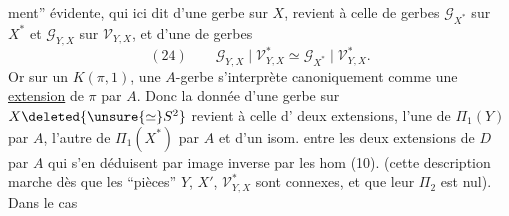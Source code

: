 ment'' évidente, qui ici dit 
d'une gerbe 
sur $X$, revient à celle de gerbes $\mathcal G_{X^*}$ sur
$X^*$ et $\mathcal G_{Y,X}$ sur $\mathcal V_{Y,X}$, et d'une
 de  gerbes
\[
(24)\qquad \mathcal G_{Y,X}\mid\mathcal V^*_{Y,X}\simeq
\mathcal G_{X^*}\mid\mathcal V^*_{Y,X}.
\]
Or sur un $K(\pi,1)$, une $A$-gerbe
s'interprète canoniquement comme une
\uline{extension} de $\pi$ par $A$. Donc la donnée
d'une gerbe sur $X\deleted{{}\unsure{\simeq} S^2}$ revient à celle
d' deux extensions, l'une de
$\Pi_1(Y)$ par $A$, l'autre de $\Pi_1(X^*)$ par $A$
et d'un isom. entre les deux extensions
de $D$ par $A$ qui s'en déduisent\unsure{,}
par image inverse par les hom (10).
(cette description marche dès que les
``pièces'' $Y$, $X'$, $\mathcal V^*_{Y,X}$ sont connexes, et
que leur $\Pi_2$ est nul). Dans le cas
